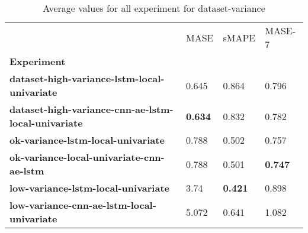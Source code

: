 \begin{table}[h]
\centering
\caption{Average values for all experiment for dataset-variance}
\label{table:Average-metric-dataset-variance}
\begin{tabular}{llll}
\toprule
{} &            MASE &           sMAPE &          MASE-7 \\
\textbf{Experiment                                        } &                 &                 &                 \\
\midrule
\textbf{dataset-high-variance-lstm-local-univariate       } &           0.645 &           0.864 &           0.796 \\
\textbf{dataset-high-variance-cnn-ae-lstm-local-univariate} &  \textbf{0.634} &           0.832 &           0.782 \\
\textbf{ok-variance-lstm-local-univariate                 } &           0.788 &           0.502 &           0.757 \\
\textbf{ok-variance-local-univariate-cnn-ae-lstm          } &           0.788 &           0.501 &  \textbf{0.747} \\
\textbf{low-variance-lstm-local-univariate                } &            3.74 &  \textbf{0.421} &           0.898 \\
\textbf{low-variance-cnn-ae-lstm-local-univariate         } &           5.072 &           0.641 &           1.082 \\
\bottomrule
\end{tabular}
\end{table}
